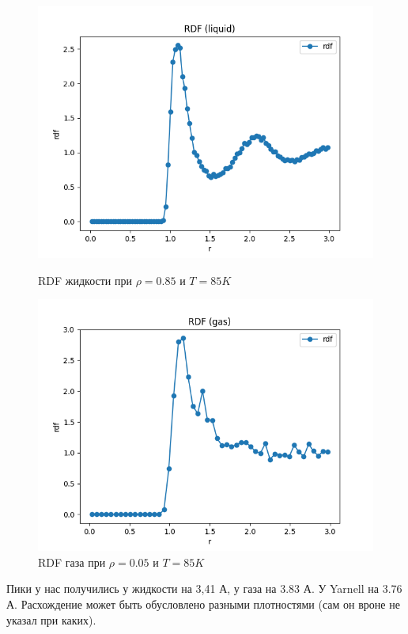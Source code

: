 \documentclass[a4paper]{article}
\begin{document}
\begin{figure}[h]
\begin{center}
\begin{minipage}[h]{0.45\linewidth}
\includegraphics[width=1\linewidth]{rdfl.png}
\caption{RDF жидкости при $\rho=0.85$ и $T= 85 K$ } %
\label{ris:experimoriginal} %
\end{minipage}
\hfill
\begin{minipage}[h]{0.45\linewidth}
\begin{center}
\includegraphics[width=1.1\textwidth]{rdf.png}
\caption{RDF газа при $\rho = 0.05$ и $T = 85 K$}
\end{center}
\end{minipage}
\end{center}
\end{figure}
Пики у нас получились у жидкости на 3,41 А, у газа на 3.83 А. У Yarnell на 3.76 А. Расхождение может быть обусловлено разными плотностями (сам он вроне не указал при каких).
\end{document}
